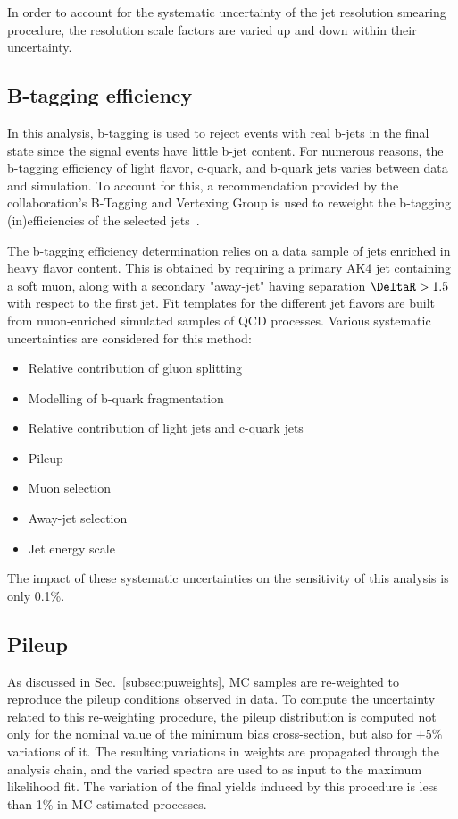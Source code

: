 In order to account for the systematic uncertainty of the jet resolution smearing procedure,
the resolution scale factors are varied up and down within their uncertainty.

\subsection{B-tagging efficiency}

In this analysis, b-tagging is used to reject events with real b-jets in 
the final state since the signal events have little b-jet content. 
For numerous reasons, the b-tagging efficiency of light flavor, c-quark, and b-quark jets varies between data and simulation.
To account for this, a recommendation provided by the collaboration's B-Tagging and Vertexing Group is used to reweight the b-tagging (in)efficiencies of the selected jets~\cite{Sirunyan:2017ezt}.

The b-tagging efficiency determination relies on a data sample of jets enriched in heavy flavor content.
This is obtained by requiring a primary AK4 jet containing a soft muon, along with a secondary "away-jet" having separation $\DeltaR>1.5$ with respect to the first jet.
Fit templates for the different jet flavors are built from muon-enriched simulated samples of QCD processes.
Various systematic uncertainties are considered for this method:
\begin{itemize}
\item Relative contribution of gluon splitting 
\item Modelling of b-quark fragmentation
\item Relative contribution of light jets and c-quark jets
\item Pileup
\item Muon selection
\item Away-jet selection
\item Jet energy scale
\end{itemize}

The impact of these systematic uncertainties on the sensitivity of this analysis is only 0.1\%.

\subsection{Pileup}

As discussed in Sec.~\ref{subsec:puweights}, MC samples are re-weighted to
reproduce the pileup conditions observed in data.
To compute the uncertainty related to this re-weighting procedure, the pileup distribution is 
computed not only for the nominal value of the minimum bias cross-section,
but also for $\pm5\%$ variations of it.
The resulting variations in weights are propagated through the analysis chain, 
and the varied \met spectra are used to as input to the maximum likelihood fit.
The variation of the final yields induced by this procedure is less than 1\% in MC-estimated processes.


